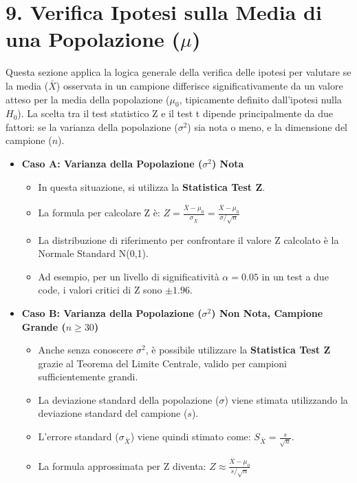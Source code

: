 \documentclass[12pt, a4paper]{article}
\newcommand{\popmean}{\mu} %
\newcommand{\samplemean}{\bar{X}} %
\newcommand{\popvar}{\sigma^2} %
\newcommand{\popsd}{\sigma} %
\newcommand{\samplesd}{s} %
\newcommand{\stderr}{\sigma_{\samplemean}} %
\newcommand{\alphaerr}{\alpha} %
\newcommand{\Hnull}{H_0} %
\begin{document}
\section*{9. Verifica Ipotesi sulla Media di una Popolazione ($\popmean$)}
Questa sezione applica la logica generale della verifica delle ipotesi per valutare se la media ($\samplemean$) osservata in un campione differisce significativamente da un valore atteso per la media della popolazione ($\mu_0$, tipicamente definito dall'ipotesi nulla $\Hnull$). La scelta tra il test statistico Z e il test t dipende principalmente da due fattori: se la varianza della popolazione ($\popvar$) sia nota o meno, e la dimensione del campione ($n$).

\begin{itemize}
    \item \textbf{Caso A: Varianza della Popolazione ($\popvar$) Nota}
        \begin{itemize}
            \item In questa situazione, si utilizza la \textbf{Statistica Test Z}.
            \item La formula per calcolare Z è: $Z = \frac{\samplemean - \mu_0}{\stderr} = \frac{\samplemean - \mu_0}{\popsd / \sqrt{n}}$
            \item La distribuzione di riferimento per confrontare il valore Z calcolato è la Normale Standard N(0,1).
            \item Ad esempio, per un livello di significatività $\alphaerr=0.05$ in un test a due code, i valori critici di Z sono $\pm 1.96$.
        \end{itemize}
    \item \textbf{Caso B: Varianza della Popolazione ($\popvar$) Non Nota, Campione Grande ($n \ge 30$)}
        \begin{itemize}
            \item Anche senza conoscere $\popvar$, è possibile utilizzare la \textbf{Statistica Test Z} grazie al Teorema del Limite Centrale, valido per campioni sufficientemente grandi.
            \item La deviazione standard della popolazione ($\popsd$) viene stimata utilizzando la deviazione standard del campione ($\samplesd$).
            \item L'errore standard ($\stderr$) viene quindi stimato come: $S_{\samplemean} = \frac{\samplesd}{\sqrt{n}}$.
            \item La formula approssimata per Z diventa: $Z \approx \frac{\samplemean - \mu_0}{\samplesd / \sqrt{n}}$

\end{itemize}
\end{itemize}
\end{document}
